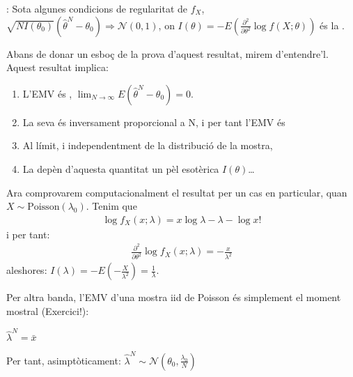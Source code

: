 \documentclass[letterpaper,10pt,english]{sphinxmanual}
\begin{document}
: Sota algunes condicions de regularitat de
\(f_X\), \(\sqrt{N {I}(\theta_0)}(\hat{\theta}^N - \theta_0) \Rightarrow \mathcal{N}(0, 1)\), on
\({I}(\theta) = - E\left(\frac{\partial^2}{\partial \theta^2}\log f(X; \theta) \right)\)
és la .

Abans de donar un esboç de la prova d’aquest resultat, mirem d’entendre’l.
Aquest resultat implica:
\begin{enumerate}
%
\item {} 
L’EMV és , \(\lim_{N \to \infty} E(\hat{\theta}^N - \theta_0) =0\).

\item {} 
La seva  és inversament proporcional a N, i per tant l’EMV és 

\item {} 
Al límit, i independentment de la distribució de la mostra, 

\item {} 
La  depèn d’aquesta quantitat un pèl esotèrica \({I}(\theta)\)…

\end{enumerate}

Ara comprovarem computacionalment el resultat per un cas en particular,
quan \(X \sim \mbox{Poisson}(\lambda_0)\). Tenim que
\begin{equation*}
\begin{split}\log f_X(x;\lambda) = x\log \lambda - \lambda - \log x!\end{split}
\end{equation*}
i per tant:
\begin{equation*}
\begin{split}\frac{\partial^2}{\partial \theta^2} \log f_X(x;\lambda) = -\frac{x}{\lambda^2}\end{split}
\end{equation*}
aleshores: \({I}(\lambda)= - E\left(-\frac{X}{\lambda^2} \right)=\frac{1}{\lambda}\).

Per altra banda, l’EMV d’una mostra
iid de Poisson és simplement el moment mostral (Exercici!):

\(\hat{\lambda}^N = \bar{x}\)

Per tant, asimptòticament: \(\hat{\lambda}^N \sim \mathcal{N}(\theta_0, \frac{\lambda_0}{N})\)
\end{document}
